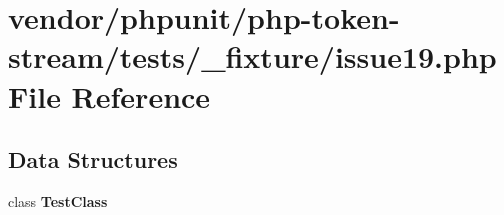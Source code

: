 \section{vendor/phpunit/php-\/token-\/stream/tests/\+\_\+fixture/issue19.php File Reference}
\label{issue19_8php}
\subsection*{Data Structures}
\begin{DoxyCompactItemize}
\item 
class {\bf Test\+Class}
\end{DoxyCompactItemize}
